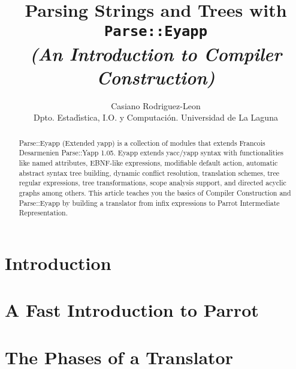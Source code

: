 \documentclass[times, 10pt,%
]{article}
\title{Parsing Strings and Trees with {\tt Parse::Eyapp}\\
\it (An Introduction to Compiler Construction)}
\author{
Casiano Rodriguez-Leon\\
Dpto. Estad\'{\i}stica, I.O. y Computaci\'{o}n.
Universidad de La Laguna
}
\begin{document}
\maketitle



%

\begin{abstract}
Parse::Eyapp (Extended yapp) is a collection of modules
that extends Francois Desarmenien Parse::Yapp 1.05.
Eyapp extends yacc/yapp syntax with 
functionalities like named attributes,
EBNF-like expressions, modifiable default action,
automatic abstract syntax tree building,
dynamic conflict resolution,
translation schemes, tree regular expressions,
tree transformations, scope analysis support,
and directed acyclic graphs among others.
This article teaches you the basics of 
Compiler Construction and Parse::Eyapp by
building a translator from infix expressions to Parrot 
Intermediate Representation.
\end{abstract}


\section{Introduction}
\label{section:introduction}


\section{A Fast Introduction to Parrot}
\label{section:parrot}


\section{The Phases of a Translator}
\label{section:phases}

\end{document}
